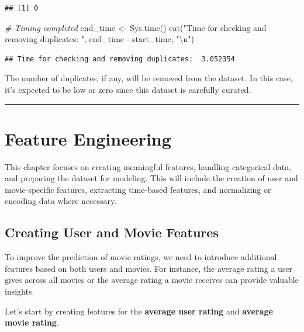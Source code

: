 \documentclass[
]{article}
\newenvironment{Shaded}{}{}
\newcommand{\CommentTok}[1]{\textcolor[rgb]{0.38,0.63,0.69}{\textit{#1}}}
\newcommand{\FunctionTok}[1]{\textcolor[rgb]{0.02,0.16,0.49}{#1}}
\newcommand{\NormalTok}[1]{#1}
\newcommand{\OtherTok}[1]{\textcolor[rgb]{0.00,0.44,0.13}{#1}}
\newcommand{\SpecialCharTok}[1]{\textcolor[rgb]{0.25,0.44,0.63}{#1}}
\newcommand{\StringTok}[1]{\textcolor[rgb]{0.25,0.44,0.63}{#1}}
\begin{document}
\begin{verbatim}
## [1] 0
\end{verbatim}

\begin{Shaded}
\begin{Highlighting}[]
\CommentTok{\# Timing completed}
\NormalTok{end\_time }\OtherTok{\textless{}{-}} \FunctionTok{Sys.time}\NormalTok{()}
\FunctionTok{cat}\NormalTok{(}\StringTok{"Time for checking and removing duplicates: "}\NormalTok{, end\_time }\SpecialCharTok{{-}}\NormalTok{ start\_time, }\StringTok{"}\SpecialCharTok{\textbackslash{}n}\StringTok{"}\NormalTok{)}
\end{Highlighting}
\end{Shaded}

\begin{verbatim}
## Time for checking and removing duplicates:  3.052354
\end{verbatim}

The number of duplicates, if any, will be removed from the dataset. In
this case, it's expected to be low or zero since this dataset is
carefully curated.

\begin{center}\rule{0.5\linewidth}{0.5pt}\end{center}

\section{Feature Engineering}\label{feature-engineering}

This chapter focuses on creating meaningful features, handling
categorical data, and preparing the dataset for modeling. This will
include the creation of user and movie-specific features, extracting
time-based features, and normalizing or encoding data where necessary.

\subsection{Creating User and Movie
Features}\label{creating-user-and-movie-features}

To improve the prediction of movie ratings, we need to introduce
additional features based on both users and movies. For instance, the
average rating a user gives across all movies or the average rating a
movie receives can provide valuable insights.

Let's start by creating features for the \textbf{average user rating}
and \textbf{average movie rating}.
\end{document}
